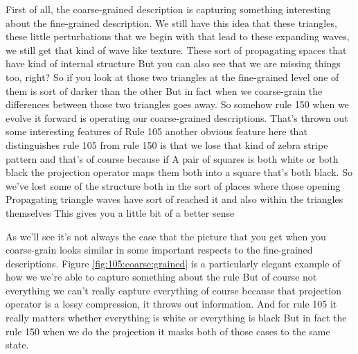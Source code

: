 \documentclass[]{article}
\begin{document}
First of all, the coarse-grained description is capturing something interesting about the fine-grained description.
We still have this idea that these triangles, these little perturbations that we begin with that lead to these expanding waves,  we still get that kind of wave like texture.
These sort of propagating spaces that have kind of internal structure
But you can also see that we are missing things too, right?
So if you look at those two triangles at the fine-grained level
one of them is sort of darker than the other
But in fact when we coarse-grain the differences
between those two triangles goes away.
So somehow rule 150
when we evolve it forward is
operating our coarse-grained descriptions.
That's thrown out some interesting features of Rule 105
another obvious feature here that
distinguishes rule 105 from rule 150
is that we lose that kind of zebra
stripe pattern
and that's of course because if
A pair of squares is both white
or both black
the projection operator maps them both
into a square that's both black.
So we've lost some of the structure
both in the sort of places
where those opening
Propagating triangle waves have
sort of reached it
and also within the triangles themselves
This gives you a little bit of a better sense

As we'll see it's not always the case that the picture that you get when you coarse-grain looks similar in some important respects to the fine-grained descriptions.
Figure \ref{fig:105:coarse:grained} is a particularly elegant example
of how we we're able to capture something about the rule
But of course not everything
we can't really capture everything of course
because that projection operator
is a lossy compression,
it throws out information.
And for rule 105 it really matters
whether everything is white or everything is black
But in fact the rule 150 when
we do the projection
it masks both of those cases to the same state.
\end{document}
